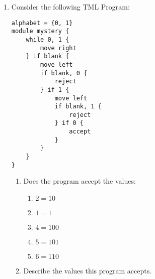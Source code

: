 \documentclass[answers]{exam}
\begin{document}
    \begin{enumerate}
        \item Consider the following TML Program:
\begin{lstlisting}[language=TML]
alphabet = {0, 1}
module mystery {
    while 0, 1 {
        move right
    } if blank {
        move left
        if blank, 0 {
            reject
        } if 1 {
            move left
            if blank, 1 {
                reject
            } if 0 {
                accept
            }
        }
    }
}
\end{lstlisting}
        \begin{enumerate}
            \item Does the program accept the values:
            \begin{enumerate}
                \item $2 = 10$
                \begin{solution}
                    
                \end{solution}
                
                \item $1 = 1$
                \begin{solution}
                    
                \end{solution}
                
                \item $4 = 100$
                \begin{solution}
                    
                \end{solution}
                
                \item $5 = 101$
                \begin{solution}
                    
                \end{solution}
                
                \item $6 = 110$
                \begin{solution}
                    
                \end{solution}
            \end{enumerate}
            
            \item Describe the values this program accepts.
            \begin{solution}
                

\end{solution}
\end{enumerate}
\end{enumerate}
\end{document}
